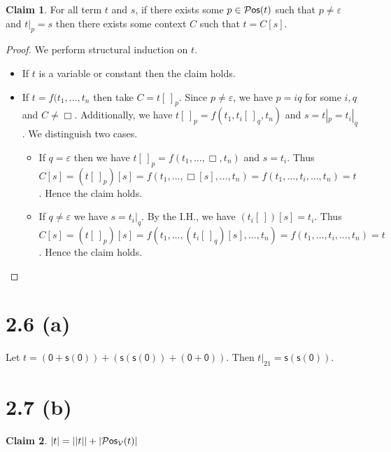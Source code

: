 \documentclass[autodetect-enginem]{article}
\newcommand{\VV}{\mathcal{V}}
\theoremstyle{plain}
\theoremstyle{definition}
\theoremstyle{definition}
\newtheorem*{claim}{Claim}
\newcommand{\m}[1]{\mathsf{#1}}
\begin{document}
\begin{claim}
    For all term $t$ and $s$,
    if there exists some $p \in \mathcal{P}\mathsf{os}(t)$ such that $p \neq \varepsilon$ and $t|_p = s$ then
    there exists some context $C$ such that $t = C[s]$.
\end{claim}

\begin{proof}
    We perform structural induction on $t$.
    \begin{itemize}
        \item If $t$ is a variable or constant then the claim holds.
        \item If $t = f(t_1,\dots, t_n$ then take $C = t[\,]_p$.
        Since $p \neq \varepsilon$, we have $p = iq$ for some $i,q$ and $C \neq \Box$.
        Additionally, we have $t[\,]_p = f(t_1, t_i[\,]_q, t_n)$ and $s = t|_p = t_i|_q$.
        We distinguish two cases.
        \begin{itemize}
            \item If $q=\varepsilon$ then we have $t[\,]_p = f(t_1,\dots,\Box,t_n)$ and $s = t_i$.
                Thus $C[s] = (t[\,]_p)[s] = f(t_1,\dots,\Box[s],\dots,t_n) = f(t_1,\dots,t_i,\dots,t_n) = t$.
                Hence the claim holds.
            \item If $q \neq \varepsilon$ we have $s = t_i|_q$. By the I.H., we have $(t_i[\,])[s] = t_i$.
                Thus $C[s] = (t[\,]_p)[s] = f(t_1,\dots,(t_i[\,]_q)[s],\dots,t_n) = f(t_1,\dots,t_i,\dots,t_n) = t$.
                Hence the claim holds.
        \end{itemize}
    \end{itemize}
\end{proof}

\section*{2.6 (a)}

Let $t = (\m{0} + \m{s}(\m{0})) + (\m{s}(\m{s}(\m{0})) + (\m{0} + \m{0}))$.
Then $t|_{21} = \m{s}(\m{s}(\m{0}))$.

\section*{2.7 (b)}

\begin{claim}
    $|t| = ||t|| + |\Pos_\VV(t)|$
\end{claim}
\end{document}
